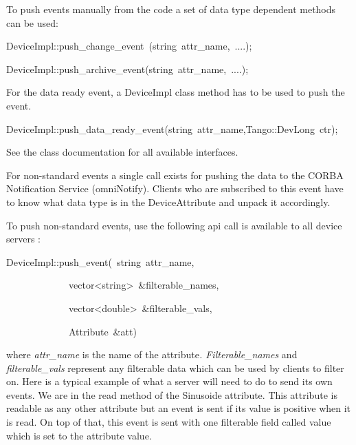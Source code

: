 To push events manually from the code a set of data type dependent
methods can be used:
\begin{lyxcode}
DeviceImpl::push\_change\_event~(string~attr\_name,~....);

DeviceImpl::push\_archive\_event(string~attr\_name,~....);
\end{lyxcode}
For the data ready event, a DeviceImpl class method has to be used
to push the event.
\begin{lyxcode}
DeviceImpl::push\_data\_ready\_event(string~attr\_name,Tango::DevLong~ctr);
\end{lyxcode}
See the class documentation for all available interfaces.

For non-standard events a single call exists for pushing the data
to the CORBA Notification Service (omniNotify). Clients who are subscribed
to this event have to know what data type is in the DeviceAttribute
and unpack it accordingly.

To push non-standard events, use the following api call is available
to all device servers :
\begin{lyxcode}
DeviceImpl::push\_event(~string~attr\_name,

~~~~~~~~~~~~~vector<string>~\&filterable\_names,

~~~~~~~~~~~~~vector<double>~\&filterable\_vals,

~~~~~~~~~~~~~Attribute~\&att)
\end{lyxcode}
where \emph{attr\_name} is the name of the attribute\emph{. Filterable\_names}
and \emph{filterable\_vals} represent any filterable data which can
be used by clients to filter on. Here is a typical example of what
a server will need to do to send its own events. We are in the read
method of the \textquotedbl{}Sinusoide\textquotedbl{} attribute. This
attribute is readable as any other attribute but an event is sent
if its value is positive when it is read. On top of that, this event
is sent with one filterable field called \textquotedbl{}value\textquotedbl{}
which is set to the attribute value.

